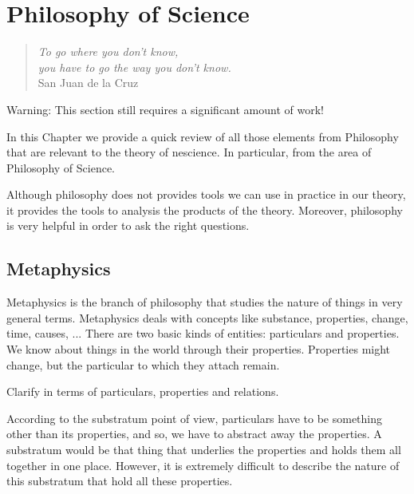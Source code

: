 %
%


\chapter{Philosophy of Science}
\label{chap:Philosophy}

\begin{quote}
\begin{flushright}
\emph{To go where you don't know, \\
you have to go the way you don't know.} \\
San Juan de la Cruz 
\end{flushright}
\end{quote}
\bigskip

{\color{red} Warning: This section still requires a significant amount of work!}

In this Chapter we provide a quick review of all those elements from Philosophy that are relevant to the theory of nescience. In particular, from the area of Philosophy of Science.

Although philosophy does not provides tools we can use in practice in our theory, it provides the tools to analysis the products of the theory. Moreover, philosophy is very helpful in order to ask the right questions.

%
%

\section{Metaphysics}

Metaphysics is the branch of philosophy that studies the nature of things in very general terms. Metaphysics deals with concepts like substance, properties, change, time, causes, ... There are two basic kinds of entities: particulars and properties. We know about things in the world through their properties. Properties might change, but the particular to which they attach remain.

{\color{red} Clarify in terms of particulars, properties and relations.}

According to the substratum point of view, particulars have to be something other than its properties, and so, we have to abstract away the properties. A substratum would be that thing that underlies the properties and holds them all together in one place. However, it is extremely difficult to describe the nature of this substratum that hold all these properties.


